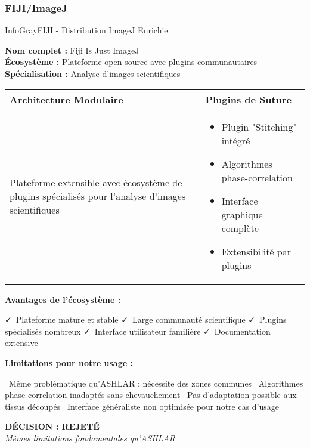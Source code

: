 \documentclass[12pt,a4paper]{report}
\newcommand{\pro}[1]{\textcolor{SuccessGreen}{\faCheck\ #1}}
\newcommand{\con}[1]{\textcolor{DangerRed}{\faTimes\ #1}}
\begin{document}
\subsubsection{FIJI/ImageJ}

\begin{techbox}{InfoGray}{FIJI - Distribution ImageJ Enrichie}

\textbf{Nom complet :} Fiji Is Just ImageJ \\
\textbf{Écosystème :} Plateforme open-source avec plugins communautaires \\
\textbf{Spécialisation :} Analyse d'images scientifiques

\vspace{0.5cm}

\begin{tabularx}{\textwidth}{|X|X|}
\hline
\rowcolor{LightGray}
\textbf{Architecture Modulaire} & \textbf{Plugins de Suture} \\
\hline
Plateforme extensible avec écosystème de plugins spécialisés pour l'analyse d'images scientifiques &
\begin{itemize}[nosep]
\item Plugin "Stitching" intégré
\item Algorithmes phase-correlation
\item Interface graphique complète
\item Extensibilité par plugins
\end{itemize} \\
\hline
\end{tabularx}

\vspace{0.5cm}

\textbf{Avantages de l'écosystème :}
\begin{itemize}[leftmargin=*]
    \pro{Plateforme mature et stable}
    \pro{Large communauté scientifique}
    \pro{Plugins spécialisés nombreux}
    \pro{Interface utilisateur familière}
    \pro{Documentation extensive}
\end{itemize}

\textbf{Limitations pour notre usage :}
\begin{itemize}[leftmargin=*]
    \con{Même problématique qu'ASHLAR : nécessite des zones communes}
    \con{Algorithmes phase-correlation inadaptés sans chevauchement}
    \con{Pas d'adaptation possible aux tissus découpés}
    \con{Interface généraliste non optimisée pour notre cas d'usage}
\end{itemize}

\begin{center}
\textbf{\textcolor{DangerRed}{DÉCISION : REJETÉ}}\\
\textit{Mêmes limitations fondamentales qu'ASHLAR}
\end{center}

\end{techbox}
\end{document}
